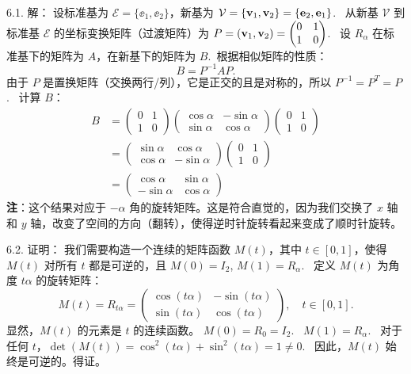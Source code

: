 \begin{exer}
6.1. 解：
设标准基为 $\mathcal{E} = \{\ee_1, \ee_2\}$，新基为 $\mathcal{V} = \{\mathbf{v}_1, \mathbf{v}_2\} = \{\mathbf{e}_2, \mathbf{e}_1\}$.~
从新基 $\mathcal{V}$ 到标准基 $\mathcal{E}$ 的坐标变换矩阵（过渡矩阵）为 $P = (\mathbf{v}_1, \mathbf{v}_2) = \begin{pmatrix} 0 & 1 \\ 1 & 0 \end{pmatrix}$.~
设 $R_\alpha$ 在标准基下的矩阵为 $A$，在新基下的矩阵为 $B$.~根据相似矩阵的性质：
$$ B = P^{-1} A P. $$
由于 $P$ 是置换矩阵（交换两行/列），它是正交的且是对称的，所以 $P^{-1} = P^T = P$.~
计算 $B$：
$$
\begin{aligned}
B &= \begin{pmatrix} 0 & 1 \\ 1 & 0 \end{pmatrix} \begin{pmatrix} \cos \alpha & -\sin \alpha \\ \sin \alpha & \cos \alpha \end{pmatrix} \begin{pmatrix} 0 & 1 \\ 1 & 0 \end{pmatrix} \\
&= \begin{pmatrix} \sin \alpha & \cos \alpha \\ \cos \alpha & -\sin \alpha \end{pmatrix} \begin{pmatrix} 0 & 1 \\ 1 & 0 \end{pmatrix} \\
&= \begin{pmatrix} \cos \alpha & \sin \alpha \\ -\sin \alpha & \cos \alpha \end{pmatrix}
\end{aligned}
$$
\textbf{注}：这个结果对应于 $-\alpha$ 角的旋转矩阵。这是符合直觉的，因为我们交换了 $x$ 轴和 $y$ 轴，改变了空间的方向（翻转），使得逆时针旋转看起来变成了顺时针旋转。

6.2. 证明：
我们需要构造一个连续的矩阵函数 $M(t)$，其中 $t \in [0, 1]$，使得 $M(t)$ 对所有 $t$ 都是可逆的，且 $M(0) = I_2$, $M(1) = R_\alpha$.~
定义 $M(t)$ 为角度 $t\alpha$ 的旋转矩阵：
$$ M(t) = R_{t\alpha} = \begin{pmatrix} \cos(t\alpha) & -\sin(t\alpha) \\ \sin(t\alpha) & \cos(t\alpha) \end{pmatrix}, \quad t \in [0, 1]. $$
显然，$M(t)$ 的元素是 $t$ 的连续函数。
$M(0) = R_0 = I_2$.~
$M(1) = R_\alpha$.~
对于任何 $t$，$\det(M(t)) = \cos^2(t\alpha) + \sin^2(t\alpha) = 1 \neq 0$.~
因此，$M(t)$ 始终是可逆的。得证。


\end{exer}
